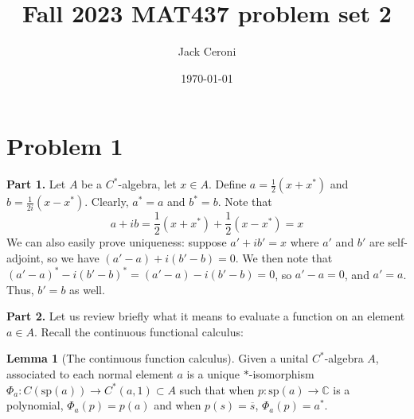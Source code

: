 \documentclass[aps,pra,showpacs,notitlepage,onecolumn,superscriptaddress,nofootinbib]{revtex4-1}
\newcommand{\hhrulefill}{\hspace{-1.0em}\hrulefill}
\theoremstyle{definition}
\newtheorem{lemma}{Lemma}[section]
\begin{document}
\title{Fall 2023 MAT437 problem set 2}
\author{Jack Ceroni}

\date{\today}

\maketitle

\hhrulefill

\section{Problem 1}

\noindent \textbf{Part 1.} Let $A$ be a $C^{*}$-algebra, let $x \in A$. Define $a = \frac{1}{2}(x + x^{*})$ and $b = \frac{1}{2i}(x - x^{*})$. Clearly, $a^{*} = a$ and $b^{*} = b$. Note that
\begin{equation}
  a + ib =  \frac{1}{2}(x + x^{*}) +  \frac{1}{2}(x - x^{*}) = x
\end{equation}
We can also easily prove uniqueness: suppose $a' + ib' = x$ where $a'$ and $b'$ are self-adjoint, so we have $(a' - a) + i(b' - b) = 0$. We then note that $(a' - a)^{*} - i(b' - b)^{*} = (a' - a) - i(b' - b) = 0$, so
$a' - a = 0$, and $a' = a$. Thus, $b' = b$ as well.
\newline

\noindent \textbf{Part 2.} Let us review briefly what it means to evaluate a function on an element $a \in A$. Recall the continuous functional calculus:

\begin{lemma}[The continuous function calculus]
  Given a unital $C^{*}$-algebra $A$, associated to each normal element $a$ is a unique $*$-isomorphism $\Phi_a : C(\text{sp}(a)) \rightarrow C^{*}(a, 1) \subset A$ such
  that when $p : \text{sp}(a) \rightarrow \mathbb{C}$ is a polynomial, $\Phi_a(p) = p(a)$ and when $p(s) = \overline{s}$, $\Phi_a(p) = a^{*}$.
  \label{lem:cont}
\end{lemma}
\end{document}

